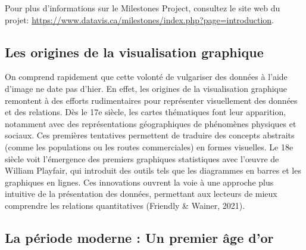 \documentclass[
  letterpaper,
  DIV=11,
  numbers=noendperiod]{scrreprt}
\begin{document}
\begin{tcolorbox}[enhanced jigsaw, rightrule=.15mm, left=2mm, opacityback=0, leftrule=.75mm, toprule=.15mm, colbacktitle=quarto-callout-note-color!10!white, colframe=quarto-callout-note-color-frame, title=\textcolor{quarto-callout-note-color}{\faInfo}\hspace{0.5em}{Note}, bottomrule=.15mm, bottomtitle=1mm, opacitybacktitle=0.6, toptitle=1mm, titlerule=0mm, coltitle=black, colback=white, arc=.35mm, breakable]

Pour plus d'informations sur le Milestones Project, consultez le site
web du projet:
\url{https://www.datavis.ca/milestones/index.php?page=introduction}.

\end{tcolorbox}

\hypertarget{les-origines-de-la-visualisation-graphique}{%
\subsection{Les origines de la visualisation
graphique}\label{les-origines-de-la-visualisation-graphique}}

On comprend rapidement que cette volonté de vulgariser des données à
l'aide d'image ne date pas d'hier. En effet, les origines de la
visualisation graphique remontent à des efforts rudimentaires pour
représenter visuellement des données et des relations. Dès le 17e
siècle, les cartes thématiques font leur apparition, notamment avec des
représentations géographiques de phénomènes physiques et sociaux. Ces
premières tentatives permettent de traduire des concepts abstraits
(comme les populations ou les routes commerciales) en formes visuelles.
Le 18e siècle voit l'émergence des premiers graphiques statistiques avec
l'œuvre de William Playfair, qui introduit des outils tels que les
diagrammes en barres et les graphiques en lignes. Ces innovations
ouvrent la voie à une approche plus intuitive de la présentation des
données, permettant aux lecteurs de mieux comprendre les relations
quantitatives (Friendly \& Wainer, 2021).

\hypertarget{la-puxe9riode-moderne-un-premier-uxe2ge-dor}{%
\subsection{La période moderne : Un premier âge
d'or}\label{la-puxe9riode-moderne-un-premier-uxe2ge-dor}}
\end{document}
